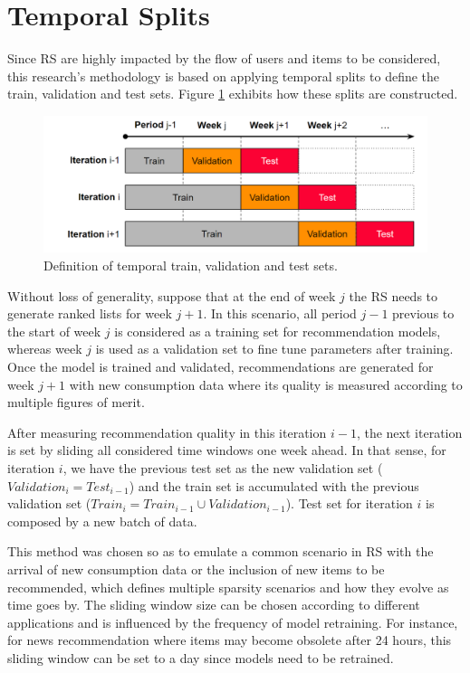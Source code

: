 \section{Temporal Splits}

Since RS are highly impacted by the flow of users and items to be considered, this research's methodology is based on applying temporal splits to define the train, validation and test sets. Figure \ref{fig:temporal_validation} exhibits how these splits are constructed.

\begin{figure}[ht]
    \centering
    \includegraphics[width=\textwidth]{figs/temporal_validation.png}
    \caption{Definition of temporal train, validation and test sets.}
    \label{fig:temporal_validation}
\end{figure}

Without loss of generality, suppose that at the end of week $j$ the RS needs to generate ranked lists for week $j+1$. In this scenario, all period $j-1$ previous to the start of week $j$ is considered as a training set for recommendation models, whereas week $j$ is used as a validation set to fine tune parameters after training. Once the model is trained and validated, recommendations are generated for week $j+1$ with new consumption data where its quality is measured according to multiple figures of merit.

After measuring recommendation quality in this iteration $i-1$, the next iteration is set by sliding all considered time windows one week ahead. In that sense, for iteration $i$, we have the previous test set as the new validation set ($Validation_{i} = Test_{i-1}$) and the train set is accumulated with the previous validation set ($Train_{i} = Train_{i-1} \cup Validation_{i-1}$). Test set for iteration $i$ is composed by a new batch of data.

This method was chosen so as to emulate a common scenario in RS with the arrival of new consumption data or the inclusion of new items to be recommended, which defines multiple sparsity scenarios and how they evolve as time goes by. The sliding window size can be chosen according to different applications and is influenced by the frequency of model retraining. For instance, for news recommendation where items may become obsolete after 24 hours, this sliding window can be set to a day since models need to be retrained. 

